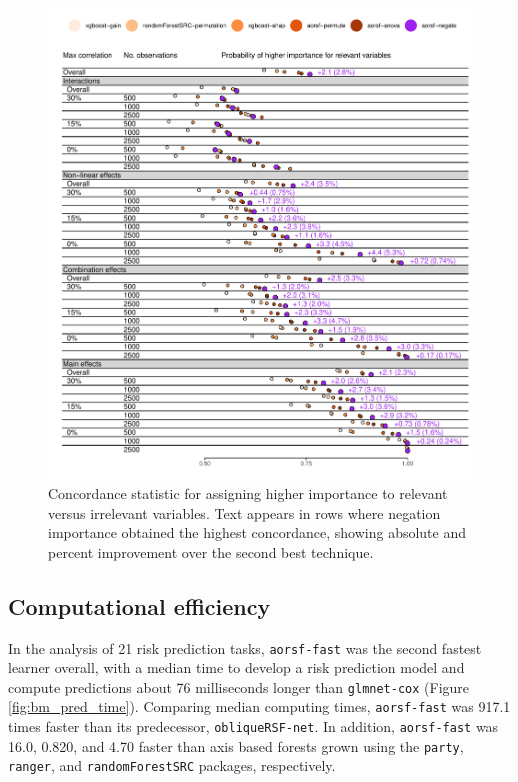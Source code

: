 \documentclass[12pt]{article}\usepackage[]{graphicx}\usepackage[]{xcolor}
\makeatletter
\def\maxwidth{ %
  \ifdim\Gin@nat@width>\linewidth
    \linewidth
  \else
    \Gin@nat@width
  \fi
}
\newenvironment{knitrout}{}{} %
\makeatother
\begin{document}
\begin{knitrout}
\color{fgcolor}\begin{figure}
\includegraphics[width=\maxwidth]{figure/bm_vi_viz-1} \caption[Concordance statistic for assigning higher importance to relevant versus irrelevant variables]{Concordance statistic for assigning higher importance to relevant versus irrelevant variables. Text appears in rows where negation importance obtained the highest concordance, showing absolute and percent improvement over the second best technique.}\label{fig:bm_vi_viz}
\end{figure}

\end{knitrout}

\subsection{Computational efficiency} \label{sec:results_computing}




In the analysis of 21 risk prediction tasks, \texttt{aorsf-fast} was the second fastest learner overall, with a median time to develop a risk prediction model and compute predictions about 76 milliseconds longer than \texttt{glmnet-cox} (Figure \ref{fig:bm_pred_time}). Comparing median computing times, \texttt{aorsf-fast} was 917.1 times faster than its predecessor, \texttt{obliqueRSF-net}. In addition, \texttt{aorsf-fast} was 16.0, 0.820, and 4.70 faster than axis based forests grown using the \texttt{party}, \texttt{ranger}, and \texttt{randomForestSRC} packages, respectively.
\end{document}
